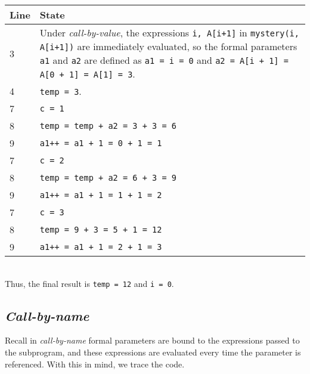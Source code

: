 \documentclass[paper=a4, fontsize=11pt]{scrartcl} %
\numberwithin{equation}{section} %
\numberwithin{figure}{section} %
\numberwithin{table}{section} %
\begin{document}
\begin{tabular}{| p{0.05\linewidth} | p{0.95\linewidth} |}
\hline
	\textbf{Line} & \textbf{State} \\
\hline
	3 & Under \emph{call-by-value}, the expressions \texttt{i, A[i+1]} in \texttt{mystery(i, A[i+1])} are immediately evaluated, so the formal parameters \texttt{a1} and \texttt{a2} are defined as \texttt{a1 = i = 0} and \texttt{a2 = A[i + 1] = A[0 + 1] = A[1] = 3}.\\
\hline
	4 & \texttt{temp = 3}.\\
\hline
	7 & \texttt{c = 1}\\
\hline
	8 & \texttt{temp = temp + a2 = 3 + 3 = 6}\\
\hline
	9 & \texttt{a1++ = a1 + 1 = 0 + 1 = 1}\\
\hline
	7 & \texttt{c = 2}\\
\hline
	8 & \texttt{temp = temp + a2 = 6 + 3 = 9}\\
\hline
	9 & \texttt{a1++ = a1 + 1 = 1 + 1 = 2}\\
\hline
	7 & \texttt{c = 3}\\
\hline
	8 & \texttt{temp = 9 + 3 = 5 + 1 = 12}\\
\hline
	9 & \texttt{a1++ = a1 + 1 = 2 + 1 = 3}\\
\hline
\end{tabular}\\

Thus, the final result is \texttt{temp = 12} and \texttt{i = 0}.

\subsection{\emph{Call-by-name}}

Recall in \emph{call-by-name} formal parameters are bound to the expressions passed to the subprogram, and these expressions are evaluated every time the parameter is referenced. With this in mind, we trace the code.\\
\end{document}
